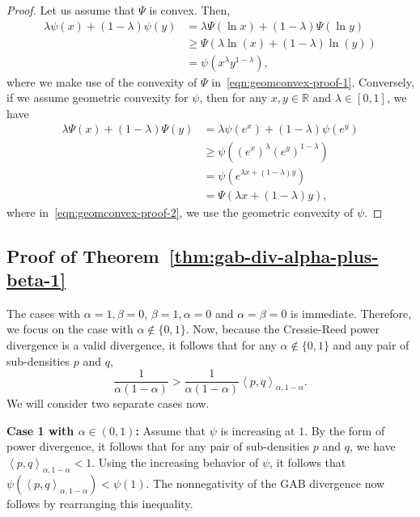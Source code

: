 \documentclass[11pt]{article}
\theoremstyle{plain}
\theoremstyle{remark}
\def\R{\mathbb{R}}
\newcommand{\inner}[1]{\left\langle #1\right\rangle}
\begin{document}
\begin{proof}
    Let us assume that $\Psi$ is convex. Then,
    \begin{align}
        \lambda \psi(x) + (1 - \lambda) \psi(y)
         & = \lambda \Psi( \ln x) + (1 - \lambda) \Psi(\ln y) \nonumber                               \\
         & \geq \Psi\left( \lambda \ln(x) + (1-\lambda) \ln(y) \right) \label{eqn:geomconvex-proof-1} \\
         & = \psi(x^\lambda y^{1-\lambda}), \nonumber
    \end{align}
    \noindent where we make use of the convexity of $\Psi$ in~\eqref{eqn:geomconvex-proof-1}. Conversely, if we assume geometric convexity for $\psi$, then for any $x, y \in \R$ and $\lambda \in [0, 1]$, we have
    \begin{align}
        \lambda \Psi(x) + (1 - \lambda) \Psi(y)
         & = \lambda \psi(e^x) + (1 - \lambda) \psi(e^y)\nonumber                     \\
         & \geq \psi((e^x)^\lambda (e^y)^{1 - \lambda})\label{eqn:geomconvex-proof-2} \\
         & = \psi(e^{\lambda x + (1 - \lambda)y})\nonumber                            \\
         & = \Psi(\lambda x + (1 - \lambda)y),\nonumber
    \end{align}
    \noindent where in~\eqref{eqn:geomconvex-proof-2}, we use the geometric convexity of $\psi$.
\end{proof}




\subsection{Proof of Theorem~\ref{thm:gab-div-alpha-plus-beta-1}}

The cases with $\alpha = 1, \beta = 0$, $\beta = 1, \alpha = 0$ and $\alpha = \beta = 0$ is immediate. Therefore, we focus on the case with $\alpha \notin \{ 0, 1\}$. Now, because the Cressie-Reed power divergence is a valid divergence, it follows that for any $\alpha  \notin \{0, 1\}$ and any pair of sub-densities $p$ and $q$,
\begin{equation*}
    \dfrac{1}{\alpha(1-\alpha)} > \dfrac{1}{\alpha(1-\alpha)} \inner{p,q}_{\alpha,1-\alpha}.
\end{equation*}
\noindent We will consider two separate cases now.

\noindent\textbf{Case 1 with $\alpha \in (0, 1)$:} Assume that $\psi$ is increasing at $1$. By the form of power divergence, it follows that for any pair of sub-densities $p$ and $q$, we have $\inner{p, q}_{\alpha,1-\alpha} < 1$. Using the increasing behavior of $\psi$, it follows that $\psi(\inner{p,q}_{\alpha,1-\alpha}) < \psi(1)$. The nonnegativity of the GAB divergence now follows by rearranging this inequality.
\end{document}
